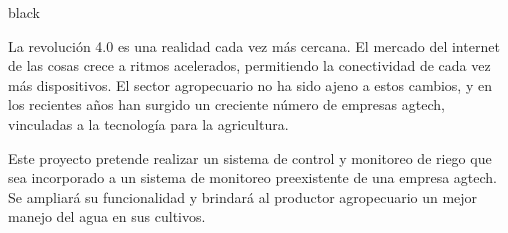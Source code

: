 \documentclass[11pt]{charter}
\begin{document}
\begin{consigna}{black}




La revolución 4.0 es una realidad cada vez más cercana. El mercado del internet de las cosas crece a ritmos acelerados, permitiendo la conectividad de cada vez más dispositivos. El sector agropecuario no ha sido ajeno a estos cambios, y en los recientes años han surgido un creciente número de empresas agtech, vinculadas a la tecnología para la agricultura.

Este proyecto pretende realizar un sistema de control y monitoreo de riego que sea incorporado a un sistema de monitoreo preexistente de una empresa agtech. Se ampliará su funcionalidad y brindará al productor agropecuario un mejor manejo del agua en sus cultivos. 


\end{consigna}
\end{document}
